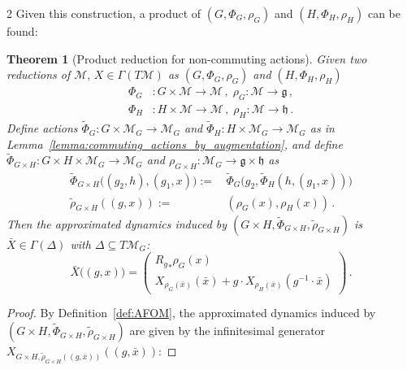 \documentclass{article}
\newtheorem{theorem}{Theorem}[section]
\newtheorem{proof}{Proof}[theorem]
\newcommand{\M}{\mathcal{M}}                                %
\newcommand{\g}{\mathfrak{g}}                               %
\newcommand{\appX}{\bar{X}}
\newcommand{\state}{x}
\newcommand{\appstate}{\bar{x}}
\newcommand{\pmat}[1]{\begin{pmatrix}#1\end{pmatrix}}
\begin{document}
\begin{multicols}{2}
Given this construction, a product of $(G,\Phi_G,\rho_G)$ and $(H,\Phi_H,\rho_H)$ can be found: 
\begin{theorem}[Product reduction for non-commuting actions]\label{thm:product_reduction_nc}
    Given two reductions of $\M,\, X\in \Gamma(T\M)$ as $(G,\Phi_G,\rho_G)$ and $(H,\Phi_H,\rho_H)$ 
    \begin{align}
        \Phi_G&:G\times\M\rightarrow\M \,,\; \rho_G:\M\rightarrow\g \,, \\
        \Phi_H&:H\times\M \rightarrow\M\,,\; \rho_H:\M\rightarrow\mathfrak{h}\,.
    \end{align}
    Define actions $\widetilde{\Phi}_G:G\times\M_G\rightarrow \M_G$ and $\widetilde{\Phi}_H:H\times\M_G\rightarrow \M_G$ as in Lemma~\ref{lemma:commuting_actions_by_augmentation}, and define $\widetilde{\Phi}_{G\times H}: G\times H \times \M_G \rightarrow \M_G$ and $\rho_{G\times H}:\M_G \rightarrow \g \times \mathfrak{h}$ as
    \begin{align}
        \widetilde{\Phi}_{G\times H} \big((g_2,h),(g_1,\state)\big) :=&\, \widetilde{\Phi}_G\big(g_2,\widetilde{\Phi}_H(h,(g_1,\state))\big) \label{eq:product_action_nc} \\ 
        \widetilde{\rho}_{G\times H}((g,\state)) :=&\, (\rho_G(\state),\rho_H(\state)) \label{eq:product_reduced_vector_field_nc}\,.
    \end{align}
    Then the approximated dynamics induced by $(G\times H, \widetilde{\Phi}_{G\times H}, \widetilde{\rho}_{G\times H})$ is $\appX\in\Gamma(\Delta)$ with $\Delta\subseteq T\M_G$: 
    \begin{equation}
        \appX\big((g,\state)\big) = \pmat{ 
            {R_g}_*\rho_G(\state) \\ X_{\rho_G(\appstate)}(\appstate) + g\cdot X_{\rho_H(\appstate)}(g^{-1}\cdot\appstate) %
        } \,. 
    \end{equation}
\end{theorem} 
\begin{proof}
    By Definition~\ref{def:AFOM}, the approximated dynamics induced by $(G\times H, \widetilde{\Phi}_{G\times H}, \widetilde{\rho}_{G\times H})$ are given by the infinitesimal generator $X_{G\times H, \widetilde{\rho}_{G\times H}((g,\appstate))}((g,\appstate))$:

\end{proof}
\end{multicols}
\end{document}
